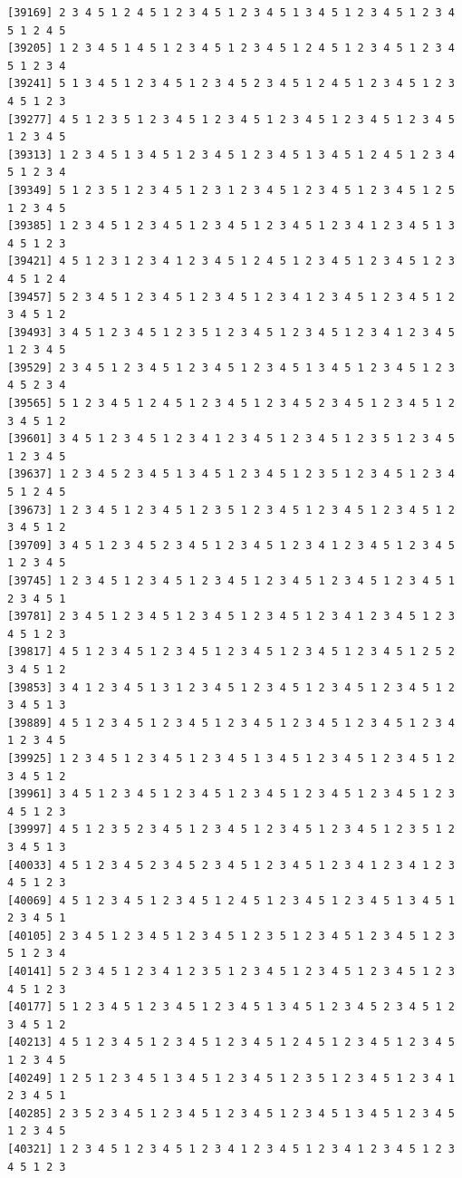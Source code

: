 \documentclass[
  11pt,
]{book}
\begin{document}
\begin{verbatim}
[39169] 2 3 4 5 1 2 4 5 1 2 3 4 5 1 2 3 4 5 1 3 4 5 1 2 3 4 5 1 2 3 4 5 1 2 4 5
[39205] 1 2 3 4 5 1 4 5 1 2 3 4 5 1 2 3 4 5 1 2 4 5 1 2 3 4 5 1 2 3 4 5 1 2 3 4
[39241] 5 1 3 4 5 1 2 3 4 5 1 2 3 4 5 2 3 4 5 1 2 4 5 1 2 3 4 5 1 2 3 4 5 1 2 3
[39277] 4 5 1 2 3 5 1 2 3 4 5 1 2 3 4 5 1 2 3 4 5 1 2 3 4 5 1 2 3 4 5 1 2 3 4 5
[39313] 1 2 3 4 5 1 3 4 5 1 2 3 4 5 1 2 3 4 5 1 3 4 5 1 2 4 5 1 2 3 4 5 1 2 3 4
[39349] 5 1 2 3 5 1 2 3 4 5 1 2 3 1 2 3 4 5 1 2 3 4 5 1 2 3 4 5 1 2 5 1 2 3 4 5
[39385] 1 2 3 4 5 1 2 3 4 5 1 2 3 4 5 1 2 3 4 5 1 2 3 4 1 2 3 4 5 1 3 4 5 1 2 3
[39421] 4 5 1 2 3 1 2 3 4 1 2 3 4 5 1 2 4 5 1 2 3 4 5 1 2 3 4 5 1 2 3 4 5 1 2 4
[39457] 5 2 3 4 5 1 2 3 4 5 1 2 3 4 5 1 2 3 4 1 2 3 4 5 1 2 3 4 5 1 2 3 4 5 1 2
[39493] 3 4 5 1 2 3 4 5 1 2 3 5 1 2 3 4 5 1 2 3 4 5 1 2 3 4 1 2 3 4 5 1 2 3 4 5
[39529] 2 3 4 5 1 2 3 4 5 1 2 3 4 5 1 2 3 4 5 1 3 4 5 1 2 3 4 5 1 2 3 4 5 2 3 4
[39565] 5 1 2 3 4 5 1 2 4 5 1 2 3 4 5 1 2 3 4 5 2 3 4 5 1 2 3 4 5 1 2 3 4 5 1 2
[39601] 3 4 5 1 2 3 4 5 1 2 3 4 1 2 3 4 5 1 2 3 4 5 1 2 3 5 1 2 3 4 5 1 2 3 4 5
[39637] 1 2 3 4 5 2 3 4 5 1 3 4 5 1 2 3 4 5 1 2 3 5 1 2 3 4 5 1 2 3 4 5 1 2 4 5
[39673] 1 2 3 4 5 1 2 3 4 5 1 2 3 5 1 2 3 4 5 1 2 3 4 5 1 2 3 4 5 1 2 3 4 5 1 2
[39709] 3 4 5 1 2 3 4 5 2 3 4 5 1 2 3 4 5 1 2 3 4 1 2 3 4 5 1 2 3 4 5 1 2 3 4 5
[39745] 1 2 3 4 5 1 2 3 4 5 1 2 3 4 5 1 2 3 4 5 1 2 3 4 5 1 2 3 4 5 1 2 3 4 5 1
[39781] 2 3 4 5 1 2 3 4 5 1 2 3 4 5 1 2 3 4 5 1 2 3 4 1 2 3 4 5 1 2 3 4 5 1 2 3
[39817] 4 5 1 2 3 4 5 1 2 3 4 5 1 2 3 4 5 1 2 3 4 5 1 2 3 4 5 1 2 5 2 3 4 5 1 2
[39853] 3 4 1 2 3 4 5 1 3 1 2 3 4 5 1 2 3 4 5 1 2 3 4 5 1 2 3 4 5 1 2 3 4 5 1 3
[39889] 4 5 1 2 3 4 5 1 2 3 4 5 1 2 3 4 5 1 2 3 4 5 1 2 3 4 5 1 2 3 4 1 2 3 4 5
[39925] 1 2 3 4 5 1 2 3 4 5 1 2 3 4 5 1 3 4 5 1 2 3 4 5 1 2 3 4 5 1 2 3 4 5 1 2
[39961] 3 4 5 1 2 3 4 5 1 2 3 4 5 1 2 3 4 5 1 2 3 4 5 1 2 3 4 5 1 2 3 4 5 1 2 3
[39997] 4 5 1 2 3 5 2 3 4 5 1 2 3 4 5 1 2 3 4 5 1 2 3 4 5 1 2 3 5 1 2 3 4 5 1 3
[40033] 4 5 1 2 3 4 5 2 3 4 5 2 3 4 5 1 2 3 4 5 1 2 3 4 1 2 3 4 1 2 3 4 5 1 2 3
[40069] 4 5 1 2 3 4 5 1 2 3 4 5 1 2 4 5 1 2 3 4 5 1 2 3 4 5 1 3 4 5 1 2 3 4 5 1
[40105] 2 3 4 5 1 2 3 4 5 1 2 3 4 5 1 2 3 5 1 2 3 4 5 1 2 3 4 5 1 2 3 5 1 2 3 4
[40141] 5 2 3 4 5 1 2 3 4 1 2 3 5 1 2 3 4 5 1 2 3 4 5 1 2 3 4 5 1 2 3 4 5 1 2 3
[40177] 5 1 2 3 4 5 1 2 3 4 5 1 2 3 4 5 1 3 4 5 1 2 3 4 5 2 3 4 5 1 2 3 4 5 1 2
[40213] 4 5 1 2 3 4 5 1 2 3 4 5 1 2 3 4 5 1 2 4 5 1 2 3 4 5 1 2 3 4 5 1 2 3 4 5
[40249] 1 2 5 1 2 3 4 5 1 3 4 5 1 2 3 4 5 1 2 3 5 1 2 3 4 5 1 2 3 4 1 2 3 4 5 1
[40285] 2 3 5 2 3 4 5 1 2 3 4 5 1 2 3 4 5 1 2 3 4 5 1 3 4 5 1 2 3 4 5 1 2 3 4 5
[40321] 1 2 3 4 5 1 2 3 4 5 1 2 3 4 1 2 3 4 5 1 2 3 4 1 2 3 4 5 1 2 3 4 5 1 2 3

\end{verbatim}
\end{document}
